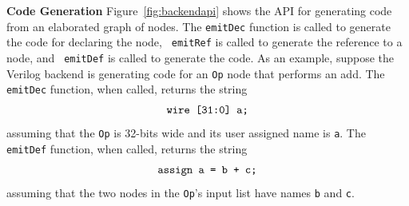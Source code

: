 {\bf Code Generation} Figure~\ref{fig:backendapi} shows the API for
generating code from an elaborated graph of nodes. The {\tt emitDec}
function is called to generate the code for declaring the node, {\tt
emitRef} is called to generate the reference to a node, and {\tt
emitDef} is called to generate the code. As an example, suppose the
Verilog backend is generating code for an {\tt Op} node that performs
an add. The {\tt emitDec} function, when called, returns the
string
\begin{align*}
\centering
\text{\tt{wire [31:0] a;}}
\end{align*}
assuming that the {\tt Op} is 32-bits wide and its user assigned name
is {\tt a}. The {\tt emitDef} function, when called, returns the
string
\begin{align*}
\centering
\text{\tt{assign a = b + c;}}
\end{align*}
assuming that the two nodes in the {\tt Op}'s input list have names
{\tt b} and {\tt c}.
